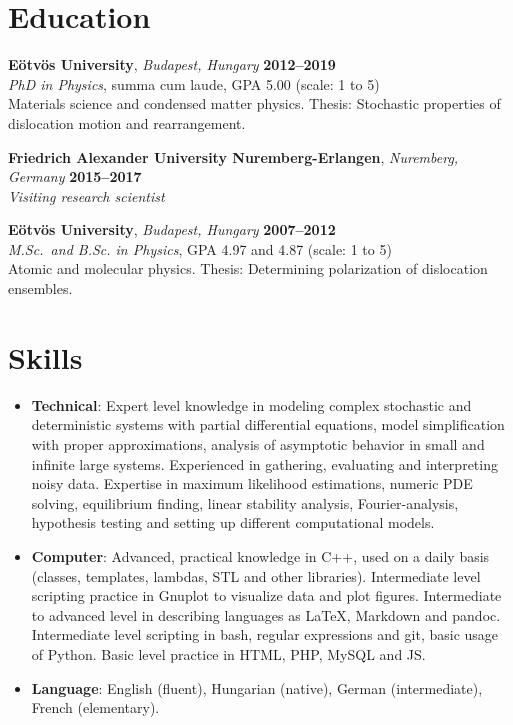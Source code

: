 \documentclass[10pt,USletter,sans]{moderncv}        %
\begin{document}
\makecvtitle
\section{Education}
\textbf{Eötvös University}, \emph{Budapest, Hungary}  \hfill \textbf{2012--2019}\\
\emph{PhD in Physics}, summa cum laude, GPA 5.00 (scale: 1 to 5)\\
Materials science and condensed matter physics. Thesis: Stochastic properties of dislocation motion and rearrangement.  %

\vspace{4pt}
\textbf{Friedrich Alexander University Nuremberg-Erlangen}, \emph{Nuremberg, Germany} \hfill \textbf{2015--2017}\\
\emph{Visiting research scientist}

\vspace{4pt}
\textbf{Eötvös University}, \emph{Budapest, Hungary}  \hfill \textbf{2007--2012}\\
\emph{M.Sc.\ and B.Sc. in Physics}, GPA 4.97 and 4.87 (scale: 1 to 5)\\
Atomic and molecular physics. Thesis: Determining polarization of dislocation ensembles.

\section{Skills}
\begin{itemize}
\item \textbf{Technical}: Expert level knowledge in modeling complex stochastic and deterministic systems with partial differential equations, model simplification with proper approximations, analysis of asymptotic behavior in small and infinite large systems. Experienced in gathering, evaluating and interpreting noisy data. Expertise in maximum likelihood estimations, numeric PDE solving, equilibrium finding, linear stability analysis, Fourier-analysis, hypothesis testing and setting up different computational models.
\vspace{4pt}
\item \textbf{Computer}: Advanced, practical knowledge in C++, used on a daily basis (classes, templates, lambdas, STL and other libraries). Intermediate level scripting practice in Gnuplot to visualize data and plot figures. Intermediate to advanced level in describing languages as LaTeX, Markdown and pandoc. Intermediate level scripting in bash, regular expressions and git, basic usage of Python. Basic level practice in HTML, PHP, MySQL and JS.
\vspace{4pt}
\item \textbf{Language}: English (fluent), Hungarian (native), German (intermediate), French (elementary).
\end{itemize}
\end{document}
